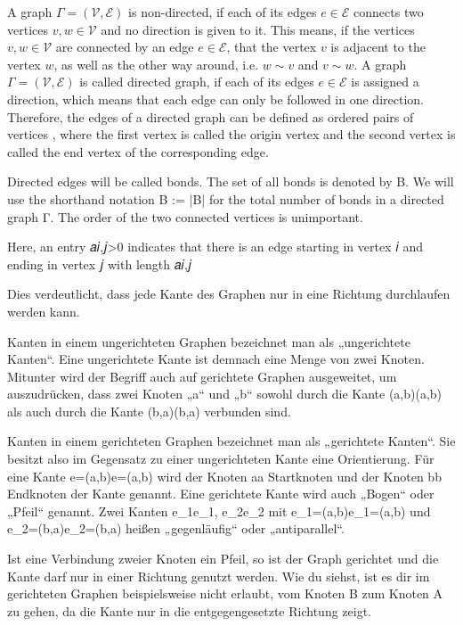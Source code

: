 A graph $\Gamma = (\mathcal{V}, \mathcal{E})$ is non-directed, if each of its edges $e \in \mathcal{E}$ connects two vertices $v, w \in \mathcal{V}$ and no direction is given to it. This means, if the vertices $v, w \in \mathcal{V}$ are connected by an edge $e \in \mathcal{E}$, that the vertex $v$ is adjacent to the vertex $w$, as well as the other way around, i.e. $w \sim v$ and $v \sim w$. A graph $\Gamma = (\mathcal{V}, \mathcal{E})$ is called directed graph, if each of its edges $e \in \mathcal{E}$ is assigned a direction, which means that each edge can only be followed in one direction. Therefore, the edges of a directed graph can be defined as ordered pairs of vertices , where the first vertex is called the origin vertex and the second vertex is called the end vertex of the corresponding edge. 

Directed edges will be called bonds. The set of all bonds is denoted by B. We will use the shorthand notation B := |B| for the total number of bonds in a directed graph Γ.
The order of the two connected vertices is unimportant.

Here, an entry  𝑎𝑖,𝑗>0  indicates that there is an edge starting in vertex  𝑖  and ending in vertex  𝑗  with length  𝑎𝑖,𝑗 


Dies verdeutlicht, dass jede Kante des Graphen nur in eine Richtung durchlaufen werden kann.

Kanten in einem ungerichteten Graphen bezeichnet man als „ungerichtete Kanten“. Eine ungerichtete Kante ist demnach eine Menge von zwei Knoten. Mitunter wird der Begriff auch auf gerichtete Graphen ausgeweitet, um auszudrücken, dass zwei Knoten „a“ und „b“ sowohl durch die Kante {\displaystyle \left(a,b\right)}\left(a,b\right) als auch durch die Kante {\displaystyle \left(b,a\right)}\left(b,a\right) verbunden sind.

Kanten in einem gerichteten Graphen bezeichnet man als „gerichtete Kanten“. Sie besitzt also im Gegensatz zu einer ungerichteten Kante eine Orientierung. Für eine Kante {\displaystyle e=\left(a,b\right)}e=\left(a,b\right) wird der Knoten {\displaystyle a}a Startknoten und der Knoten {\displaystyle b}b Endknoten der Kante genannt. Eine gerichtete Kante wird auch „Bogen“ oder „Pfeil“ genannt. Zwei Kanten {\displaystyle e_{1}}e_{1}, {\displaystyle e_{2}}e_{2} mit {\displaystyle e_{1}=\left(a,b\right)}e_{1}=\left(a,b\right) und {\displaystyle e_{2}=\left(b,a\right)}e_{2}=\left(b,a\right) heißen „gegenläufig“ oder „antiparallel“.


Ist eine Verbindung zweier Knoten ein Pfeil, so ist der Graph gerichtet und die Kante darf nur in einer Richtung genutzt werden. Wie du siehst, ist es dir im gerichteten Graphen beispielsweise nicht erlaubt, vom Knoten B zum Knoten A zu gehen, da die Kante nur in die entgegengesetzte Richtung zeigt.

